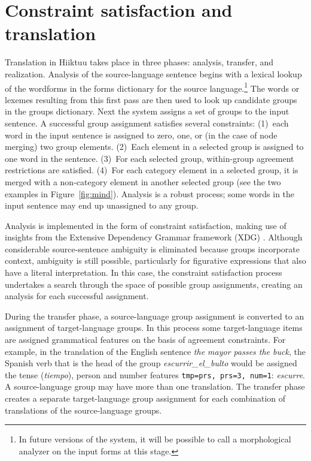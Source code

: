 \documentclass[11pt, a4paper]{article}
\begin{document}
\section{Constraint satisfaction and translation}
\label{sect:cs}

Translation in Hiiktuu takes place in three phases: analysis, transfer, and realization.
Analysis of the source-language sentence begins with a lexical lookup of the wordforms in the forms dictionary for
the source language.\footnote{In future versions
of the system, it will be possible to call a morphological analyzer on the input forms at
this stage.}
The words or lexemes resulting from this first pass are then used to look up candidate groups in the
groups dictionary.
Next the system assigns a set of groups to the input sentence.
A successful group assignment satisfies several constraints: (1)~each word in the input sentence
is assigned to zero, one, or (in the case of node merging) two group elements.
(2)~Each element in a selected group is assigned to one word in the sentence.
(3)~For each selected group, within-group agreement restrictions are satisfied.
(4)~For each category element in a selected group, it is merged with a non-category element in another
selected group (see the two examples in Figure~\ref{fig:mind}).
Analysis is a robust process; some words in the input sentence may end up unassigned to any group.

Analysis is implemented in the form of constraint satisfaction, making use of insights
from the Extensive Dependency Grammar framework (XDG) \cite{debusmann}.
Although considerable source-sentence ambiguity is eliminated because groups
incorporate context, ambiguity is still possible, particularly for figurative expressions
that also have a literal interpretation.
In this case, the constraint satisfaction process undertakes a search through the space of possible group
assignments, creating an analysis for each successful assignment.

During the transfer phase, a source-language group assignment is converted to an assignment of target-language
groups.
In this process some target-language items are assigned grammatical features on the basis of agreement constraints.
For example, in the translation of the English sentence \textit{the mayor passes the buck},
the Spanish verb that is the head of the group \textit{escurrir\_el\_bulto} would be
assigned the tense (\textit{tiempo}), person and number features \texttt{tmp=prs, prs=3, num=1}: \textit{escurre}.
A source-language group may have more than one translation.
The transfer phase creates a separate target-language group assignment for each combination of translations of the
source-language groups.
\end{document}
